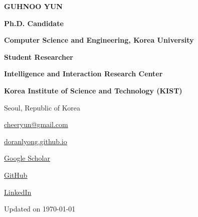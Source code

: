 \documentclass[11pt,a4paper]{article}
\newcommand{\lnk}[2]{\href{#1}{\uline{#2}}}
\begin{document}
\noindent
\begin{minipage}[t]{0.68\linewidth}
  \raggedright
  {\color{cvblue}\fontsize{24}{28}\selectfont\bfseries GUHNOO YUN\par}
  \vspace{12pt}
  \textbf{Ph.D. Candidate}\par
  \textbf{Computer Science and Engineering, Korea University}\par
  \textbf{Student Researcher}\par
  \textbf{Intelligence and Interaction Research Center}\par
  \textbf{Korea Institute of Science and Technology (KIST)}\par
  Seoul, Republic of Korea\par
\end{minipage}\hfill
\vrule width 0.6pt\hspace{0.16in}%
\begin{minipage}[t]{0.26\linewidth}
  \raggedleft\vspace{4pt}
  \lnk{mailto:cheeryun@gmail.com}{cheeryun@gmail.com}\par
  \lnk{https://doranlyong.github.io}{doranlyong.github.io}\par
  \lnk{https://scholar.google.com/citations?user=L47h01YAAAAJ}{Google Scholar}\par
  \lnk{https://github.com/DoranLyong}{GitHub}\par
  \lnk{https://www.linkedin.com/in/guhnoo-yun-71b40b178}{LinkedIn}\par
\end{minipage}

\vspace{10pt}
{\raggedleft\small Updated on \today\par}
\end{document}
